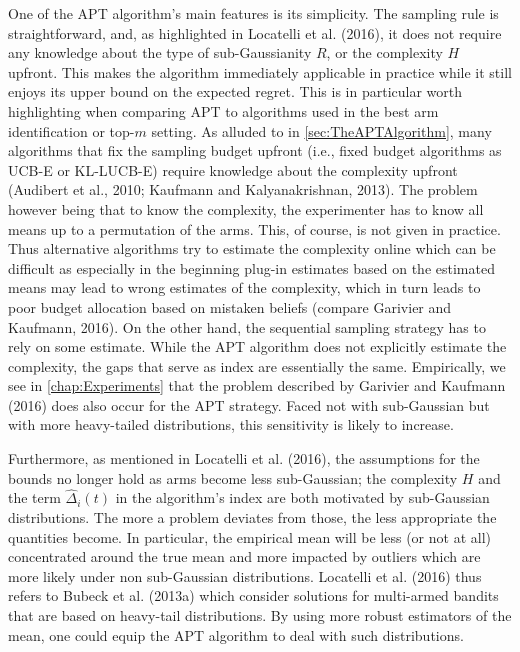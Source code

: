 \documentclass[11pt,]{article}
\begin{document}
One of the APT algorithm's main features is its simplicity. The sampling
rule is straightforward, and, as highlighted in Locatelli et al. (2016),
it does not require any knowledge about the type of sub-Gaussianity
\(R\), or the complexity \(H\) upfront. This makes the algorithm
immediately applicable in practice while it still enjoys its upper bound
on the expected regret. This is in particular worth highlighting when
comparing APT to algorithms used in the best arm identification or
top-\(m\) setting. As alluded to in \autoref{sec:TheAPTAlgorithm}, many
algorithms that fix the sampling budget upfront (i.e., fixed budget
algorithms as UCB-E or KL-LUCB-E) require knowledge about the complexity
upfront (Audibert et al., 2010; Kaufmann and Kalyanakrishnan, 2013). The
problem however being that to know the complexity, the experimenter has
to know all means up to a permutation of the arms. This, of course, is
not given in practice. Thus alternative algorithms try to estimate the
complexity online which can be difficult as especially in the beginning
plug-in estimates based on the estimated means may lead to wrong
estimates of the complexity, which in turn leads to poor budget
allocation based on mistaken beliefs (compare Garivier and Kaufmann,
2016). On the other hand, the sequential sampling strategy has to rely
on some estimate. While the APT algorithm does not explicitly estimate
the complexity, the gaps that serve as index are essentially the same.
Empirically, we see in \autoref{chap:Experiments} that the problem
described by Garivier and Kaufmann (2016) does also occur for the APT
strategy. Faced not with sub-Gaussian but with more heavy-tailed
distributions, this sensitivity is likely to increase.

Furthermore, as mentioned in Locatelli et al. (2016), the assumptions
for the bounds no longer hold as arms become less sub-Gaussian; the
complexity \(H\) and the term \(\hat{\Delta}_i(t)\) in the algorithm's
index are both motivated by sub-Gaussian distributions. The more a
problem deviates from those, the less appropriate the quantities become.
In particular, the empirical mean will be less (or not at all)
concentrated around the true mean and more impacted by outliers which
are more likely under non sub-Gaussian distributions. Locatelli et al.
(2016) thus refers to Bubeck et al. (2013a) which consider solutions for
multi-armed bandits that are based on heavy-tail distributions. By using
more robust estimators of the mean, one could equip the APT algorithm to
deal with such distributions.
\end{document}
